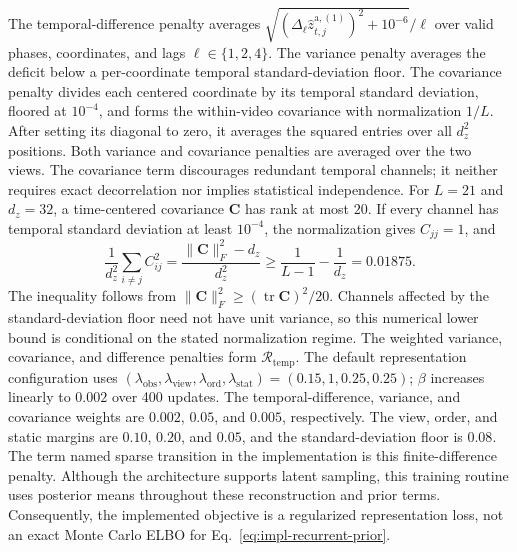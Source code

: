 The temporal-difference penalty averages
$\sqrt{(\Delta_\ell\widehat z^{\mathrm a,(1)}_{t,j})^2+10^{-6}}/\ell$
over valid phases, coordinates, and lags $\ell\in\{1,2,4\}$.
The variance penalty averages the deficit below a per-coordinate temporal
standard-deviation floor. The covariance penalty divides each centered coordinate by its temporal
standard deviation, floored at $10^{-4}$, and forms the within-video
covariance with normalization $1/L$. After setting its diagonal to zero,
it averages the squared entries over all $d_z^2$ positions.
Both variance and covariance penalties are averaged over the two views.
The covariance term discourages redundant temporal channels; it neither
requires exact decorrelation nor implies statistical independence.
For $L=21$ and $d_z=32$, a time-centered covariance $\mathbf C$ has rank
at most $20$. If every channel has temporal standard deviation at least
$10^{-4}$, the normalization gives $C_{jj}=1$, and
\[
 \frac{1}{d_z^2}\sum_{i\ne j}C_{ij}^2
 =\frac{\|\mathbf C\|_F^2-d_z}{d_z^2}
 \geq \frac{1}{L-1}-\frac{1}{d_z}=0.01875.
\]
The inequality follows from
$\|\mathbf C\|_F^2\geq(\operatorname{tr}\mathbf C)^2/20$.
Channels affected by the standard-deviation floor need not have unit
variance, so this numerical lower bound is conditional on the stated
normalization regime. The weighted variance, covariance, and difference
penalties form $\mathcal R_{\mathrm{temp}}$.
The default representation configuration uses
$(\lambda_{\mathrm{obs}},\lambda_{\mathrm{view}},\lambda_{\mathrm{ord}},
\lambda_{\mathrm{stat}})=(0.15,1,0.25,0.25)$;
$\beta$ increases linearly to $0.002$ over 400 updates.
The temporal-difference, variance, and covariance weights are
$0.002$, $0.05$, and $0.005$, respectively. The view, order, and static
margins are $0.10$, $0.20$, and $0.05$, and the standard-deviation floor
is $0.08$.
The term named sparse transition in the implementation is this
finite-difference penalty.
Although the architecture supports latent sampling, this training routine
uses posterior means throughout these reconstruction and prior terms.
Consequently, the implemented objective is a regularized representation
loss, not an exact Monte Carlo ELBO for Eq.~\ref{eq:impl-recurrent-prior}.

